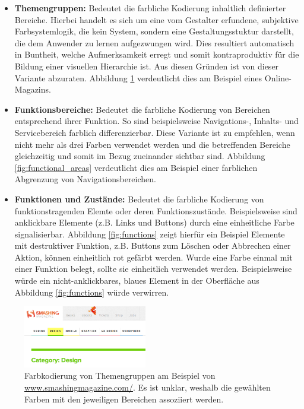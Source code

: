\documentclass[11pt, bibliography=totoc]{scrartcl}
\begin{document}
\begin{itemize}
	\item \textbf{Themengruppen:} Bedeutet die farbliche Kodierung inhaltlich definierter Bereiche. Hierbei handelt es sich um eine vom Gestalter erfundene, subjektive Farbsystemlogik, die kein System, sondern eine Gestaltungsstuktur darstellt, die dem Anwender zu lernen aufgezwungen wird. Dies resultiert automatisch in Buntheit, welche Aufmerksamkeit erregt und somit kontraproduktiv für die Bildung einer visuellen Hierarchie ist. Aus diesen Gründen ist von dieser Variante abzuraten. Abbildung \ref{fig:theme_coding} verdeutlicht dies am Beispiel eines Online-Magazins.
	\item \textbf{Funktionsbereiche:} Bedeutet die farbliche Kodierung von Bereichen entsprechend ihrer Funktion. So sind beispielsweise Navigations-, Inhalts- und Servicebereich farblich differenzierbar. Diese Variante ist zu empfehlen, wenn nicht mehr als drei Farben verwendet werden und die betreffenden Bereiche gleichzeitig und somit im Bezug zueinander sichtbar sind. Abbildung \ref{fig:functional_areas} verdeutlicht dies am Beispiel einer farblichen Abgrenzung von Navigationsbereichen.
	\item \textbf{Funktionen und Zustände:} Bedeutet die farbliche Kodierung von funktionstragenden Elemte oder deren Funktionszustände. Beispielsweise sind anklickbare Elemente (z.B. Links und Buttons) durch eine einheitliche Farbe signalisierbar. Abbildung \ref{fig:functions} zeigt hierfür ein Beispiel Elemente mit destruktiver Funktion, z.B. Buttons zum Löschen oder Abbrechen einer Aktion, können einheitlich rot gefärbt werden. Wurde eine Farbe einmal mit einer Funktion belegt, sollte sie einheitlich verwendet werden. Beispielsweise würde ein nicht-anklickbares, blaues Element in der Oberfläche aus Abbildung \ref{fig:functions} würde verwirren.
\end{itemize}

\begin{figure}[h]
	\centering
	\includegraphics[width=0.48\textwidth]{img/theme_coding.png}
	\caption{Farbkodierung von Themengruppen am Beispiel von \url{www.smashingmagazine.com/}. Es ist unklar, weshalb die gewählten Farben mit den jeweiligen Bereichen assoziiert werden.}
	\label{fig:theme_coding}
\end{figure}
\end{document}
